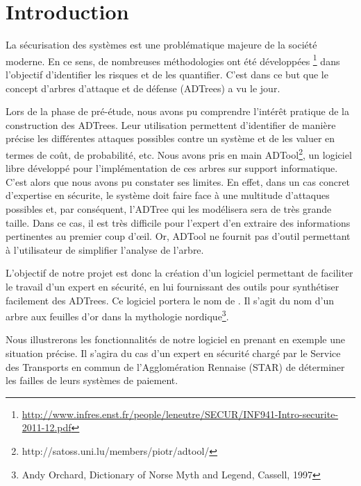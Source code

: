 \section{Introduction}
	
	La sécurisation des systèmes est une problématique majeure de la société moderne. En ce sens, de nombreuses méthodologies ont été développées \footnote{\url{http://www.infres.enst.fr/people/leneutre/SECUR/INF941-Intro-securite-2011-12.pdf}} dans l'objectif d'identifier les risques et de les quantifier. C'est dans ce but que le concept d'arbres d'attaque et de défense (ADTrees) a vu le jour.
	
	Lors de la phase de pré-étude, nous avons pu comprendre l’intérêt pratique de la construction des ADTrees. Leur utilisation permettent d'identifier de manière précise les différentes attaques possibles contre un système et de les valuer en termes de coût, de probabilité, etc. Nous avons pris en main ADTool\footnote{http://satoss.uni.lu/members/piotr/adtool/}, un logiciel libre développé pour l'implémentation de ces arbres sur support informatique. C'est alors que nous avons pu constater ses limites. En effet, dans un cas concret d'expertise en sécurite, le système doit faire face à une multitude d'attaques possibles et, par conséquent, l'ADTree qui les modélisera sera de très grande taille. Dans ce cas, il est très difficile pour l'expert d'en extraire des informations pertinentes au premier coup d’œil. Or, ADTool ne fournit pas d'outil permettant à l'utilisateur de simplifier l'analyse de l'arbre. 

	L'objectif de notre projet est donc la création d'un logiciel permettant de faciliter le travail d'un expert en sécurité, en lui fournissant des outils pour synthétiser facilement des ADTrees.	 Ce logiciel portera le nom de \glasir. Il s'agit du nom d'un arbre aux feuilles d'or dans la mythologie nordique\footnote{Andy Orchard, Dictionary of Norse Myth and Legend, Cassell, 1997}.

	Nous illustrerons les fonctionnalités de notre logiciel en prenant en exemple une situation précise. Il s'agira du cas d'un expert en sécurité chargé par le Service des Transports en commun de l'Agglomération Rennaise (STAR) de déterminer les failles de leurs systèmes de paiement.













